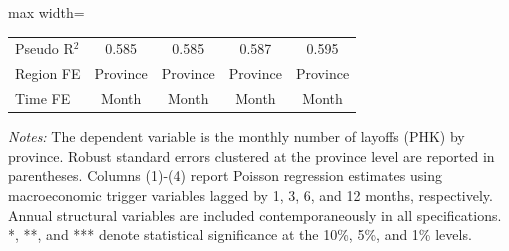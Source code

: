 \begin{table}[H]
\begin{adjustbox}{max width=\textwidth}
\begin{tabular}{l*{4}{c}}
Pseudo R$^2$&       0.585         &       0.585         &       0.587         &       0.595         \\
Region FE   &    Province         &    Province         &    Province         &    Province         \\
Time FE     &       Month         &       Month         &       Month         &       Month         \\
\bottomrule
\end{tabular}
\end{adjustbox}
\begin{tablenotes}
\footnotesize
\item \textit{Notes:} The dependent variable is the monthly number of layoffs (PHK) by province. Robust standard errors clustered at the province level are reported in parentheses. Columns (1)-(4) report Poisson regression estimates using macroeconomic trigger variables lagged by 1, 3, 6, and 12 months, respectively. Annual structural variables are included contemporaneously in all specifications. *, **, and *** denote statistical significance at the 10\%, 5\%, and 1\% levels.
\end{tablenotes}
\end{table}
